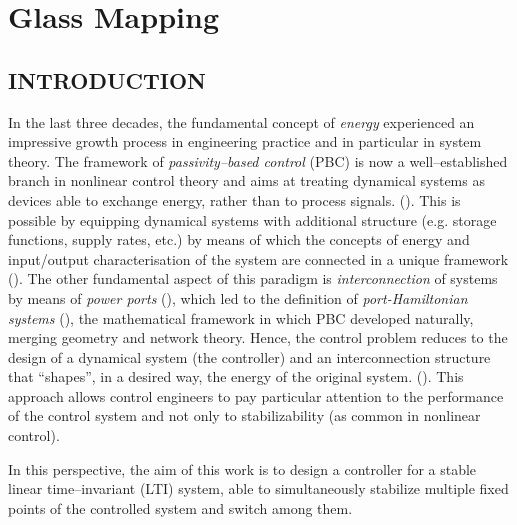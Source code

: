 
\chapter{Glass Mapping}

\label{chap:glassmapping}
\minitoc

\thispagestyle{empty}

\newpage
\section{INTRODUCTION}
In the last three decades, the fundamental concept of \textit{energy} experienced an impressive growth process in engineering practice and in particular in system theory. The framework of \textit{passivity--based control} (PBC) is now a well--established branch in nonlinear control theory and aims at treating dynamical systems as devices able to exchange energy, rather than to process signals. (\citealp{ortega2001putting}). 
This is possible by equipping dynamical systems with additional structure (e.g. storage functions, supply rates, etc.) by means of which the concepts of energy and input/output characterisation of the system are connected in a unique framework (\citealp{sontag2008input}).
The other fundamental aspect of this paradigm is \textit{interconnection} of systems by means of \textit{power ports} (\citealp{duindam2009modeling}), which led to the definition of \textit{port-Hamiltonian systems} (\citealp{MASCHKE1992359,ortega2001putting,van2014port}), the mathematical framework in which PBC developed naturally, merging geometry and network theory. Hence, the control problem reduces to the design of a dynamical system (the controller) and an interconnection
structure that ``shapes'', in a desired way, the energy of the original system. (\citealp{ortega2001putting,ortega2008control}). This approach allows control engineers to pay particular attention to the performance of the control system and not only to stabilizability (as common in nonlinear control). 

In this perspective, the aim of this work is to design a controller for a stable linear time--invariant (LTI) system, able to simultaneously stabilize multiple fixed points of the controlled system and switch among them.


